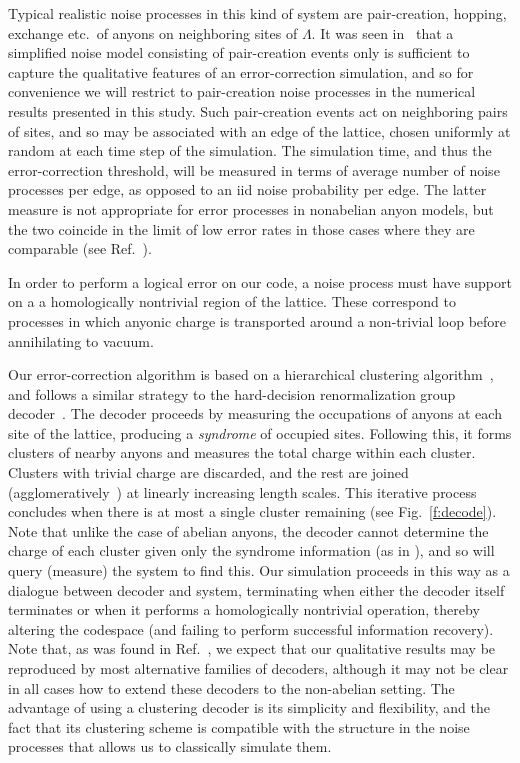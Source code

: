 \documentclass[aps, prl, letterpaper, twocolumn, superscriptaddress, notitlepage, 10pt]{revtex4-1}
\newcommand{\Fref}[1]{Fig.~\ref{#1}}
\begin{document}
Typical realistic noise processes in this kind of system are 
pair-creation, hopping, exchange etc.~of anyons on neighboring sites of $\Lambda$.
It was seen in~\cite{Brell2013} that a simplified noise model consisting of pair-creation events only 
is sufficient to capture the qualitative features of an error-correction simulation, and so for convenience we 
will restrict to pair-creation noise processes in the numerical results presented in this study. 
Such pair-creation events act on neighboring pairs of sites,
and so may be associated with an edge of the lattice, chosen 
uniformly at random at each time step of the simulation. The simulation time, and thus the 
error-correction threshold, will be measured in terms of average number of noise processes 
per edge, as opposed to an iid noise probability per edge. The latter measure is not 
appropriate for error processes in nonabelian anyon models, but the two coincide in the limit 
of low error rates in those cases where they are comparable (see Ref.~\cite{Brell2013}).

In order to perform a logical error on our code, a noise process must have support on a 
a homologically nontrivial region of the lattice.
These correspond to processes in which anyonic charge is transported around a non-trivial loop before 
annihilating to vacuum.

Our error-correction algorithm is
based on a hierarchical clustering algorithm~\cite{Hastie2009, Wootton2015b},
and follows a similar strategy to the hard-decision renormalization group decoder~\cite{Bravyi2011}. 
The decoder proceeds by measuring the occupations of 
anyons at each site of the lattice, producing a \emph{syndrome} 
of occupied sites. Following this, it forms clusters of nearby anyons and 
measures the total charge within each cluster.
Clusters with trivial charge are discarded, and
the rest are joined (agglomeratively~\cite{Hastie2009})
at linearly increasing length scales. This iterative process concludes when 
there is at most a single cluster remaining (see \Fref{f:decode}).
Note that unlike the case of abelian anyons, the decoder
cannot determine the charge of each cluster given only the syndrome information (as in \cite{Bravyi2011}),
and so will query (measure) the system to find this.
Our simulation proceeds in this way as a dialogue between decoder
and system, terminating when either the decoder itself terminates or 
when it performs a homologically nontrivial operation, thereby altering the 
codespace (and failing to perform successful information recovery).
Note that, as was found in Ref.~\cite{Brell2013}, we expect that 
our qualitative results may be reproduced by most alternative families 
of decoders, although it may not be clear in all cases how to extend these decoders to the non-abelian setting.
The advantage of using a clustering decoder is 
its simplicity and flexibility, and the fact that its clustering 
scheme is compatible with the structure in the noise 
processes that allows us to classically simulate them.
\end{document}
